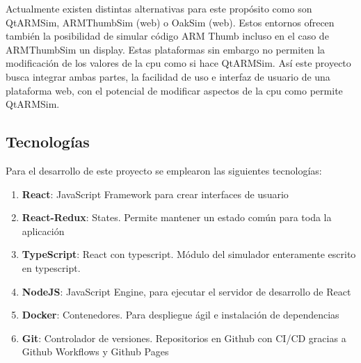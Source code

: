 {    Actualmente existen distintas alternativas para este propósito como son QtARMSim, ARMThumbSim (web) o OakSim (web).
    Estos entornos ofrecen también la posibilidad de simular código ARM Thumb incluso en el caso de ARMThumbSim un display.
    Estas plataformas sin embargo no permiten la modificación de los valores de la cpu como si hace QtARMSim. Así este proyecto busca integrar ambas partes, la facilidad de uso e interfaz de usuario de una plataforma web, con
    el potencial de modificar aspectos de la cpu como permite QtARMSim. 

    \subsection{Tecnologías}
    Para el desarrollo de este proyecto se emplearon las siguientes tecnologías:
    \begin{enumerate}
        \item \textbf{React}: JavaScript Framework para crear interfaces de usuario
        \item \textbf{React-Redux}: States. Permite mantener un estado común para toda la aplicación
        \item \textbf{TypeScript}: React con typescript. Módulo del simulador enteramente escrito en typescript.
        \item \textbf{NodeJS}: JavaScript Engine, para ejecutar el servidor de desarrollo de React
        \item \textbf{Docker}: Contenedores. Para despliegue ágil e instalación de dependencias
        \item \textbf{Git}: Controlador de versiones. Repositorios en Github con CI/CD gracias a Github Workflows y Github Pages
    \end{enumerate}

}
